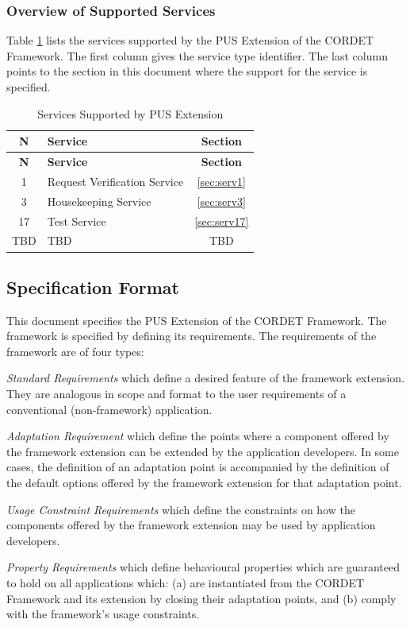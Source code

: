 \documentclass[a4paper,10pt]{article}
\newenvironment{fw_itemize}						%
{\begin{itemize}
  \setlength{\itemsep}{1mm}
  \setlength{\parskip}{0pt}
  \setlength{\parsep}{0pt}}
{\end{itemize}}
\begin{document}
\subsubsection{Overview of Supported Services}
Table \ref{tab:supportedServ} lists the services supported by the PUS Extension of the CORDET Framework. The first column gives the service type identifier. The last column points to the section in this document where the support for the service is specified.

\begin{longtable}{|c|>{\raggedright\arraybackslash}p{6cm}|c|}
\caption{Services Supported by PUS Extension}\label{tab:supportedServ} \\
\hline
\rowcolor{light-gray}
\textbf{N} &\textbf{Service} & \textbf{Section} \\
\hline\hline
\endfirsthead
\rowcolor{light-gray}
\textbf{N} &\textbf{Service} & \textbf{Section} \\
\hline\hline
\endhead
1 & Request Verification Service & \ref{sec:serv1} \\
\hline
3 & Housekeeping Service & \ref{sec:serv3} \\
\hline
17 & Test Service & \ref{sec:serv17} \\
\hline
TBD & TBD & TBD \\
\hline
\end{longtable} 


\subsection{Specification Format} 
This document specifies the PUS Extension of the CORDET Framework. The framework is specified by defining its requirements. The requirements of the framework are of four types:

\begin{fw_itemize}
\item{} \textit{Standard Requirements} which define a desired feature of the framework extension. They are analogous in scope and format to the user requirements of a conventional (non-framework) application.
\item{} \textit{Adaptation Requirement} which define the points where a component offered by the framework extension can be extended by the application developers. 
In some cases, the definition of an adaptation point is accompanied by the definition of the default options offered by the framework extension for that adaptation point.  
\item{} \textit{Usage Constraint Requirements} which define the constraints on how the components offered by the framework extension may be used by application developers.
\item{} \textit{Property Requirements} which define behavioural properties which are guaranteed to hold on all applications which: (a) are instantiated from the CORDET Framework and its extension by closing their adaptation points, and (b) comply with the framework's usage constraints.
\end{fw_itemize}
\end{document}
